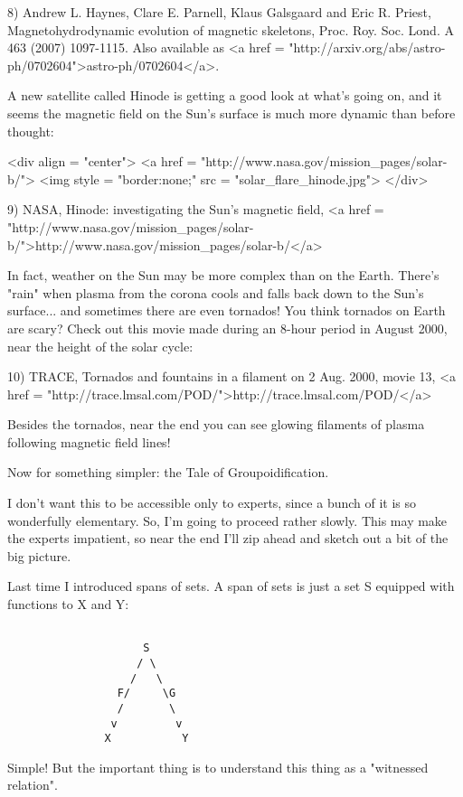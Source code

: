 8) Andrew L. Haynes, Clare E. Parnell, Klaus Galsgaard and Eric R.
Priest, Magnetohydrodynamic evolution of magnetic skeletons, 
Proc. Roy. Soc. Lond. A 463 (2007) 1097-1115.  Also available as
<a href = "http://arxiv.org/abs/astro-ph/0702604">astro-ph/0702604</a>.

A new satellite called Hinode is getting a good look at what's going 
on, and it seems the magnetic field on the Sun's surface is much more 
dynamic than before thought:

<div align = "center">
<a href = "http://www.nasa.gov/mission_pages/solar-b/">
<img style = "border:none;" src = "solar_flare_hinode.jpg">
</div>

9) NASA, Hinode: investigating the Sun's magnetic field,
<a href = "http://www.nasa.gov/mission_pages/solar-b/">http://www.nasa.gov/mission_pages/solar-b/</a>

In fact, weather on the Sun may be more complex than on the Earth.  
There's "rain" when plasma from the corona cools and falls back down 
to the Sun's surface... and sometimes there are even tornados!  You 
think tornados on Earth are scary?  Check out this movie made during 
an 8-hour period in August 2000, near the height of the solar cycle:

10) TRACE, Tornados and fountains in a filament on 2 Aug. 2000, 
movie 13, <a href = "http://trace.lmsal.com/POD/">http://trace.lmsal.com/POD/</a>

Besides the tornados, near the end you can see glowing filaments of plasma
following magnetic field lines!

Now for something simpler: the Tale of Groupoidification.  

I don't want this to be accessible only to experts, since a bunch of
it is so wonderfully elementary.  So, I'm going to proceed rather slowly.  
This may make the experts impatient, so near the end I'll zip ahead and 
sketch out a bit of the big picture.  

Last time I introduced spans of sets.  A span of sets is just a set S 
equipped with functions to X and Y:


\begin{verbatim}

                     S
                    / \
                   /   \
                 F/     \G
                 /       \
                v         v 
               X           Y
\end{verbatim}
    
Simple!  But the important thing is to understand this thing as a
"witnessed relation".  

